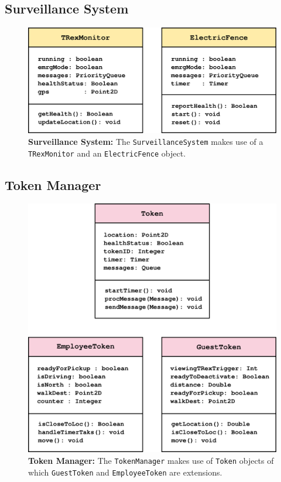 \documentclass[12pt]{article}
\begin{document}
\subsection{Surveillance System}
\begin{figure}[H]
    \centerline{\includegraphics[scale=0.8]{SSystem.png}}
    \caption{\textbf{Surveillance System:} The \texttt{SurveillanceSystem} makes use of a \texttt{TRexMonitor} and an 
    \texttt{ElectricFence} object.}
    \label{fig:ssystem}
\end{figure}

\subsection{Token Manager}
\begin{figure}[H]
    \centerline{\includegraphics[scale=0.8]{TManager.png}}
    \caption{\textbf{Token Manager:} The \texttt{TokenManager} makes use of \texttt{Token} objects
    of which \texttt{GuestToken} and \texttt{EmployeeToken} are extensions.}
    \label{fig:tmanager}
\end{figure}
\end{document}
